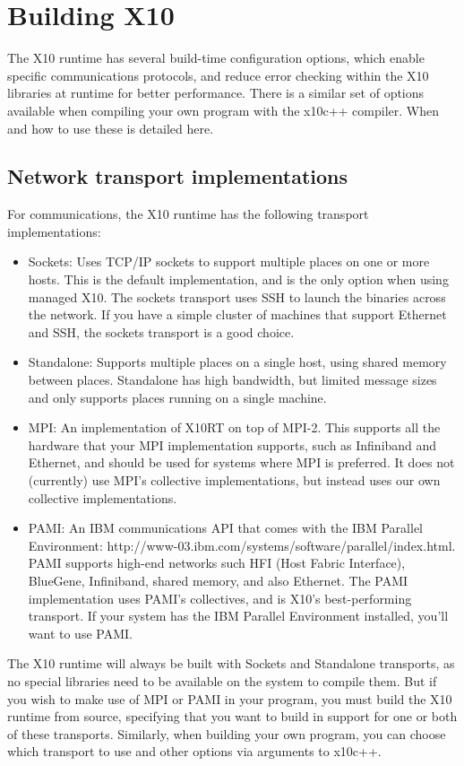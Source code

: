 \chapter{Building X10}
The X10 runtime has several build-time configuration options, which enable
specific communications protocols, and reduce error checking within the X10
libraries at runtime for better performance.  There is a similar set of options
available when compiling your own program with the x10c++ compiler.  When and
how to use these is detailed here.

\section{Network transport implementations}
For communications, the X10 runtime has the following transport implementations:
\begin{itemize}
\item Sockets: Uses TCP/IP sockets to support multiple places on one or more hosts.
This is the default implementation, and is the only option when using managed
X10.  The sockets transport uses SSH to launch the binaries across the network.
If you have a simple cluster of machines that support Ethernet and SSH, the
sockets transport is a good choice.
\item Standalone: Supports multiple places on a single host, using shared memory
between places. Standalone has high bandwidth, but limited message sizes and
only supports places running on a single machine.
\item MPI: An implementation of X10RT on top of MPI-2. This supports all the
hardware that your MPI implementation supports, such as Infiniband and
Ethernet, and should be used for systems where MPI is preferred.  It does not
(currently) use MPI's collective implementations, but instead uses our own
collective implementations.
\item PAMI: An IBM communications API that comes with the IBM Parallel Environment:
http://www-03.ibm.com/systems/software/parallel/index.html.  PAMI supports
high-end networks such HFI (Host Fabric Interface), BlueGene, Infiniband,
shared memory, and also Ethernet.  The PAMI implementation uses PAMI's
collectives, and is X10's best-performing transport.  If your system has the IBM
Parallel Environment installed, you'll want to use PAMI.
\end{itemize}

The X10 runtime will always be built with Sockets and Standalone
transports, as no special libraries need to be available on the system to compile them.  But
if you wish to make use of MPI or PAMI in your program, you must build the X10
runtime from source, specifying that you want to build in support for one or
both of these transports.  Similarly, when building your own program, you can
choose which transport to use and other options via arguments to x10c++.

